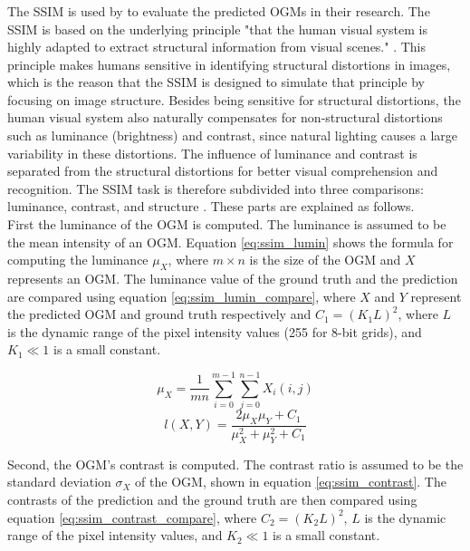 \subsubsection{} 
The \gls{SSIM} is used by \cite{mohajerin2019multi} to evaluate the predicted \glspl{OGM} in their research. The \gls{SSIM} is based on the underlying principle "that the human visual system is highly adapted to extract structural information from visual scenes." \cite{wang2009mean}. This principle makes humans sensitive in identifying structural distortions in images, which is the reason that the \gls{SSIM} is designed to simulate that principle by focusing on image structure. Besides being sensitive for structural distortions, the human visual system also naturally compensates for non-structural distortions such as luminance (brightness) and contrast, since natural lighting causes a large variability in these distortions. The influence of luminance and contrast is separated from the structural distortions for better visual comprehension and recognition. The \gls{SSIM} task is therefore subdivided into three comparisons: luminance, contrast, and structure \cite{wang2004image}. These parts are explained as follows.\\

First the luminance of the \gls{OGM} is computed. The luminance is assumed to be the mean intensity of an \gls{OGM}. Equation \ref{eq:ssim_lumin} shows the formula for computing the luminance $\mu_X$, where $m \times n$ is the size of the \gls{OGM} and $X$ represents an \gls{OGM}. The luminance value of the ground truth and the prediction are compared using equation \ref{eq:ssim_lumin_compare}, where $X$ and $Y$ represent the predicted \gls{OGM} and ground truth respectively and $C_1 = (K_1 L)^2$, where $L$ is the dynamic range of the pixel intensity values (255 for 8-bit grids), and $K_1 \ll 1$ is a small constant.

\begin{equation} \label{eq:ssim_lumin}
	\mu_X = \frac{1}{mn}\sum_{i=0}^{m-1}\sum_{j=0}^{n-1}X_i(i,j)
\end{equation}
\begin{equation} \label{eq:ssim_lumin_compare}
	l(X,Y) = \frac{2\mu_X \mu_Y + C_1}{\mu_X ^2 + \mu_Y ^2 + C_1}
\end{equation}

Second, the \gls{OGM}'s contrast is computed. The contrast ratio is assumed to be the standard deviation $\sigma_X$ of the \gls{OGM}, shown in equation \ref{eq:ssim_contrast}. The contrasts of the prediction and the ground truth are then compared using equation \ref{eq:ssim_contrast_compare}, where $C_2 = (K_2 L)^2$, $L$ is the dynamic range of the pixel intensity values, and $K_2 \ll 1$ is a small constant.


